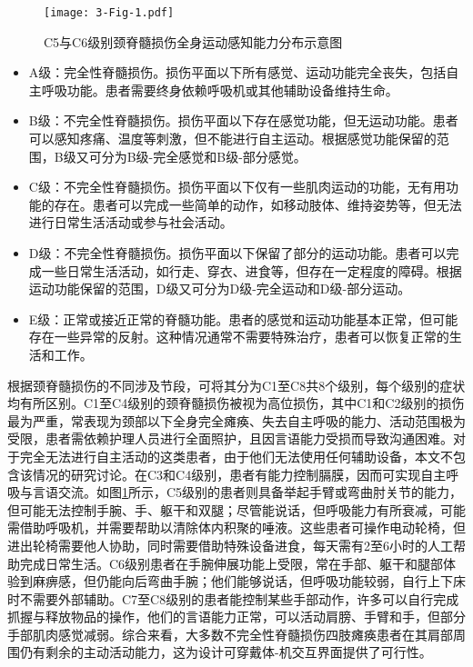 \begin{figure}[htb]
    \centering
    \texttt{[image: 3-Fig-1.pdf]}
    \caption{C5与C6级别颈脊髓损伤全身运动感知能力分布示意图}
    \label{fig:3-1}
\end{figure}    

\begin{itemize}
\item A级：完全性脊髓损伤。损伤平面以下所有感觉、运动功能完全丧失，包括自主呼吸功能。患者需要终身依赖呼吸机或其他辅助设备维持生命。
\item B级：不完全性脊髓损伤。损伤平面以下存在感觉功能，但无运动功能。患者可以感知疼痛、温度等刺激，但不能进行自主运动。根据感觉功能保留的范围，B级又可分为B级-完全感觉和B级-部分感觉。
\item C级：不完全性脊髓损伤。损伤平面以下仅有一些肌肉运动的功能，无有用功能的存在。患者可以完成一些简单的动作，如移动肢体、维持姿势等，但无法进行日常生活活动或参与社会活动。
\item D级：不完全性脊髓损伤。损伤平面以下保留了部分的运动功能。患者可以完成一些日常生活活动，如行走、穿衣、进食等，但存在一定程度的障碍。根据运动功能保留的范围，D级又可分为D级-完全运动和D级-部分运动。
\item E级：正常或接近正常的脊髓功能。患者的感觉和运动功能基本正常，但可能存在一些异常的反射。这种情况通常不需要特殊治疗，患者可以恢复正常的生活和工作。
\end{itemize}

根据颈脊髓损伤的不同涉及节段，可将其分为C1至C8共8个级别，每个级别的症状均有所区别。C1至C4级别的颈脊髓损伤被视为高位损伤，其中C1和C2级别的损伤最为严重，常表现为颈部以下全身完全瘫痪、失去自主呼吸的能力、活动范围极为受限，患者需依赖护理人员进行全面照护，且因言语能力受损而导致沟通困难。对于完全无法进行自主活动的这类患者，由于他们无法使用任何辅助设备，本文不包含该情况的研究讨论。在C3和C4级别，患者有能力控制膈膜，因而可实现自主呼吸与言语交流。如图\ref{fig:3-1}所示，C5级别的患者则具备举起手臂或弯曲肘关节的能力，但可能无法控制手腕、手、躯干和双腿；尽管能说话，但呼吸能力有所衰减，可能需借助呼吸机，并需要帮助以清除体内积聚的唾液。这些患者可操作电动轮椅，但进出轮椅需要他人协助，同时需要借助特殊设备进食，每天需有2至6小时的人工帮助完成日常生活。C6级别患者在手腕伸展功能上受限，常在手部、躯干和腿部体验到麻痹感，但仍能向后弯曲手腕；他们能够说话，但呼吸功能较弱，自行上下床时不需要外部辅助。C7至C8级别的患者能控制某些手部动作，许多可以自行完成抓握与释放物品的操作，他们的言语能力正常，可以活动肩膀、手臂和手，但部分手部肌肉感觉减弱。综合来看，大多数不完全性脊髓损伤四肢瘫痪患者在其肩部周围仍有剩余的主动活动能力\cite{shefflerNeuromuscularElectricalStimulation2007}，这为设计可穿戴体-机交互界面提供了可行性。

